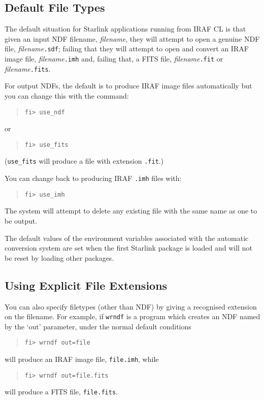 \documentclass[twoside,11pt]{article}
\newcommand{\xlabel}[1]{}
\begin{document}
\subsection{\xlabel{default_file_types}Default File Types}
The default situation for Starlink applications running from IRAF CL is that
given an input NDF filename, \textit{filename}, they will attempt to open a 
genuine NDF file, \textit{filename}{\texttt{.sdf}}; failing that they will 
attempt to open and convert an IRAF image file, 
\textit{filename}{\texttt{.imh}} and, failing that, a FITS file, 
\textit{filename}{\texttt{.fit}} or \textit{filename}{\texttt{.fits}}. 

For output NDFs, the default is to produce IRAF image files automatically but
you can change this with the command:
\begin{quote} \begin{verbatim}
fi> use_ndf
\end{verbatim} \end{quote}
or
\begin{quote} \begin{verbatim}
fi> use_fits
\end{verbatim} \end{quote}
(\texttt{use\_fits} will produce a file with extension \texttt{.fit}.)

You can change back to producing IRAF \texttt{.imh} files with:
\begin{quote} \begin{verbatim}
fi> use_imh
\end{verbatim} \end{quote}

The system will attempt to delete any existing file with the same name as one
to be output.

The default values of the environment variables associated with the automatic
conversion system are set when the first Starlink package is loaded and will
not be reset by loading other packages.

\subsection{\xlabel{using_explicit_file_extensions}Using Explicit File Extensions}
You can also specify filetypes (other than NDF) by giving a recognised 
extension on the filename. For example, if \texttt{wrndf} is a program which
creates an NDF named by the `out' parameter, under the normal default conditions
\begin{quote} \begin{verbatim}
fi> wrndf out=file
\end{verbatim} \end{quote}
will produce an IRAF image file, \texttt{file.imh}, while
\begin{quote} \begin{verbatim}
fi> wrndf out=file.fits
\end{verbatim} \end{quote}
will produce a FITS file, \texttt{file.fits}.
\end{document}
